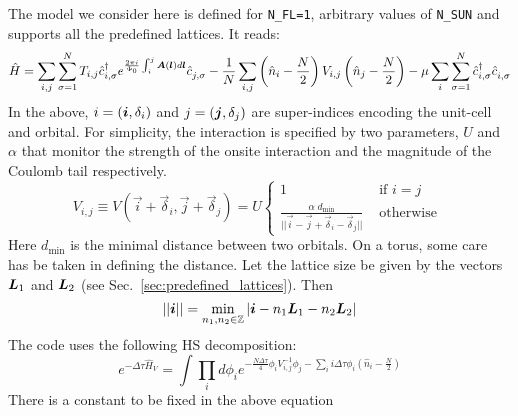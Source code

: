 
The model we consider  here is  defined  for \texttt{N\_FL=1},  arbitrary values of \texttt{N\_SUN}  and  supports all the predefined lattices.  It  reads: 
\begin{equation}
\hat{H}=  \sum_{i,j}  \sum_{\sigma =1}^{N}  T_{i, j}    \hat{c}^{\dagger}_{i, \sigma }   e^{\frac{2 \pi i}{\Phi_0} \int_{i}^{j}  
     \vec{A}(\ve{l})  d \ve{l}} \hat{c}^{}_{j,\sigma}   -
     \frac{1} { N } \sum_{i,j}  \left(  \hat{n}_{i} -  \frac{N}{2}  \right)  V_{i,j} \left(  \hat{n}_{j} -  \frac{N}{2}  \right)
      - \mu \sum_{i}  \sum_{\sigma =1}^{N} \hat{c}^{\dagger}_{i,\sigma } \hat{c}^{\phantom\dagger}_{i,\sigma}
\end{equation}
In the above,  $i = (\boldsymbol{i}, \delta_i) $  and $j = (\boldsymbol{j}, \delta_j) $  are super-indices encoding the unit-cell and orbital.   For simplicity, the interaction is specified by  two  parameters, $U$ and $\alpha$ that monitor the  strength of the onsite interaction and the magnitude of the Coulomb tail  respectively.  
\begin{equation}
	V_{i, j}     \equiv V(\vec{i}  + \vec{\delta}_i ,  \vec{j}  + \vec{\delta}_j  )  =   U \left\{
	\begin{array}{ll}  
	1          &   \text{ if }  i = j    \\
	\frac{\alpha   \;   d_\mathrm{min}}{  {  || \vec{i} - \vec{j} + \vec{\delta}_i - \vec{\delta}_j  ||}   } &     \text{ otherwise }
	\end{array}
\right.
\end{equation}
Here $d_\mathrm{min}$ is the minimal distance between two orbitals.      On a  torus, some care  has be taken in  defining the distance. Let the lattice size be given by the vectors $\boldsymbol{L}_1$  and  $\boldsymbol{L}_2$  (see Sec.~\ref{sec:predefined_lattices}).  Then 
\begin{equation}
	|| \boldsymbol{i} || = \min_{n_1,n_2 \in \mathbb{Z} }  | \boldsymbol{i} - n_1 \boldsymbol{L}_1 -  n_2 \boldsymbol{L}_2 | 
\end{equation}
 The code uses the following  HS decomposition:
\begin{equation}
e^{-\Delta \tau \hat{H}_V }  =  \int \prod_{i} d \phi_{i}   e^{ - \frac{N \Delta \tau} {4} \phi_{i} V^{-1}_{i,j}  \phi_{j} - \sum_{i}  i \Delta \tau \phi_i \left( \hat{n}_{i} - \frac{N}{2} \right) } 
\end{equation}
{\color{red}   There is a constant to be fixed in the above equation}



